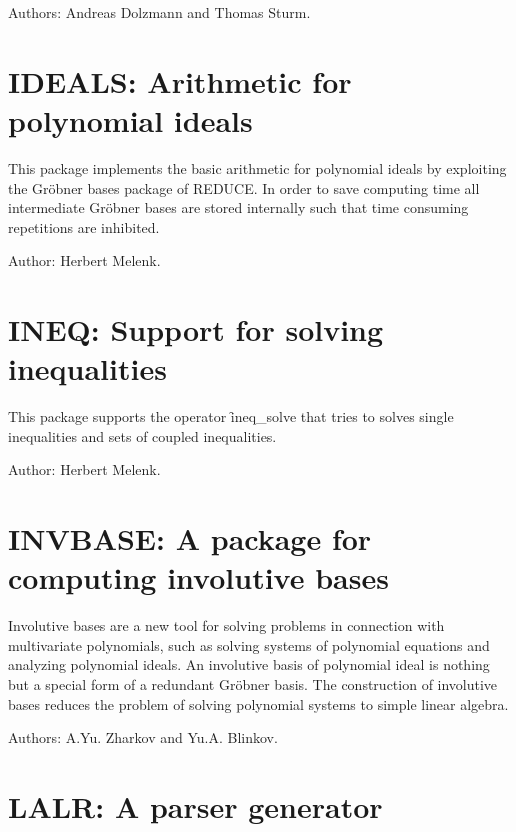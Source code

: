 Authors: Andreas Dolzmann and Thomas Sturm.


\newpage

\section{IDEALS: Arithmetic for polynomial ideals} 

This package implements the basic arithmetic for polynomial ideals by
exploiting the Gr\"obner bases package of REDUCE.  In order to save
computing time all intermediate Gr\"obner bases are stored internally such
that time consuming repetitions are inhibited.

Author: Herbert Melenk.


\newpage

\section{INEQ: Support for solving inequalities} 

This package supports the operator \f{ineq\_solve} that 
tries to solves single inequalities and sets of coupled inequalities.

Author: Herbert Melenk.


\newpage

\section{INVBASE: A package for computing involutive bases} 

Involutive bases are a new tool for solving problems in connection with
multivariate polynomials, such as solving systems of polynomial equations
and analyzing polynomial ideals.  An involutive basis of polynomial ideal
is nothing but a special form of a redundant Gr\"obner basis.  The
construction of involutive bases reduces the problem of solving polynomial
systems to simple linear algebra.

Authors: A.Yu. Zharkov and Yu.A. Blinkov.


\newpage

\section{LALR: A parser generator}

